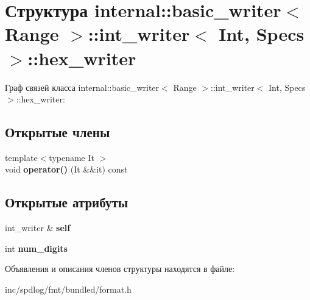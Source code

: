\hypertarget{structinternal_1_1basic__writer_1_1int__writer_1_1hex__writer}{}\section{Структура internal\+:\+:basic\+\_\+writer$<$ Range $>$\+:\+:int\+\_\+writer$<$ Int, Specs $>$\+:\+:hex\+\_\+writer}
\label{structinternal_1_1basic__writer_1_1int__writer_1_1hex__writer}


Граф связей класса internal\+:\+:basic\+\_\+writer$<$ Range $>$\+:\+:int\+\_\+writer$<$ Int, Specs $>$\+:\+:hex\+\_\+writer\+:
\subsection*{Открытые члены}
\begin{DoxyCompactItemize}
\item 
\mbox{\label{structinternal_1_1basic__writer_1_1int__writer_1_1hex__writer_a82b14394f143b024410685bcf6f43b33}} 
{\footnotesize template$<$typename It $>$ }\\void {\bfseries operator()} (It \&\&it) const
\end{DoxyCompactItemize}
\subsection*{Открытые атрибуты}
\begin{DoxyCompactItemize}
\item 
\mbox{\label{structinternal_1_1basic__writer_1_1int__writer_1_1hex__writer_a58cb71b44cde996f894542b51e5e5820}} 
int\+\_\+writer \& {\bfseries self}
\item 
\mbox{\label{structinternal_1_1basic__writer_1_1int__writer_1_1hex__writer_ade613161910034a495dbde5091a9b95c}} 
int {\bfseries num\+\_\+digits}
\end{DoxyCompactItemize}


Объявления и описания членов структуры находятся в файле\+:\begin{DoxyCompactItemize}
\item 
inc/spdlog/fmt/bundled/format.\+h\end{DoxyCompactItemize}

